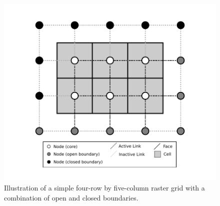 \documentclass[12pt]{article}
\begin{document}
 \begin{figure}[h!]
    \centering
    \includegraphics{example_raster_grid_with_closed_boundaries.pdf}
    \caption{Illustration of a simple four-row by five-column raster grid with a combination of open and closed boundaries.}
   \label{raster4x5openclosed}
\end{figure}



\end{document}
